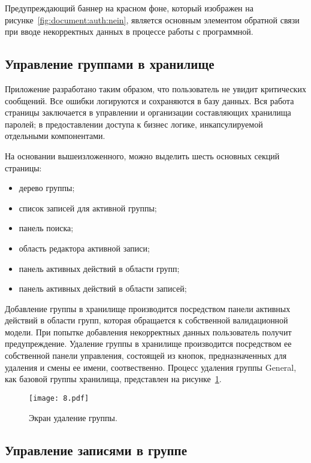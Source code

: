 Предупреждающий баннер на красном фоне, который изображен на рисунке~\ref{fig:document:auth:nein}, является основным элементом обратной связи при вводе некорректных данных в процессе работы с программной.

\subsection{Управление группами в хранилище}
\label{sec:document:created_groupe}

Приложение разработано таким образом, что пользователь не увидит критических сообщений. Все ошибки логируются и сохраняются в базу данных.
Вся работа страницы заключается в управлении и организации составляющих хранилища паролей; в предоставлении доступа к бизнес логике, инкапсулируемой отдельными компонентами.

На основании вышеизложенного, можно выделить шесть основных секций страницы:
\begin{itemize}
	\item дерево группы;
	\item список записей для активной группы;
	\item панель поиска;
	\item область редактора активной записи;
	\item панель активных действий в области групп;
	\item панель активных действий в области записей;
\end{itemize}

Добавление группы в хранилище производится посредством панели активных действий в области групп, которая обращается к собственной валидационной модели. При попытке добавления некорректных данных пользователь получит предупреждение.
Удаление группы в хранилище производится посредством ее собственной панели управления, состоящей из кнопок, предназначенных для удаления и смены ее имени, соотвественно. Процесс удаления группы General, как базовой группы хранилища, представлен на рисунке~\ref{fig:document:created_group:eith}.
\begin{figure}[ht]
\centering
  \texttt{[image: 8.pdf]}
  \caption{ Экран удаление группы. }
  \label{fig:document:created_group:eith}
\end{figure}

\subsection{Управление записями в группе}
\label{sec:document:created_entry}

